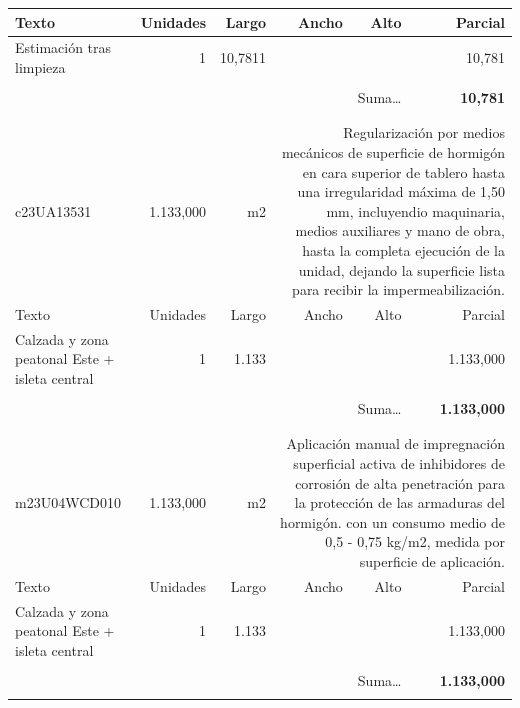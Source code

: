 \documentclass{book}%
\begin{document}
\begin{longtable}{lrrrrr}
Texto&Unidades&Largo&Ancho&Alto&Parcial\\%
\hline%
\multicolumn{1}{p{3.5cm}}{Estimación tras limpieza}&1&10,7811&&&    10,781\\%
&&&&&\\%
\multicolumn{5}{r}{Suma\ldots}&\textbf{    10,781}\\%
\hline%
&&&&&\\%
&&&&&\\%
c23UA13531& 1.133,000& m2&\multicolumn{3}{p{6cm}}{\scriptsize Regularización por medios mecánicos de superficie de hormigón en cara superior de tablero hasta una irregularidad máxima de 1,50 mm, incluyendio maquinaria, medios auxiliares y mano de obra, hasta la completa ejecución de la unidad, dejando la superficie lista para recibir la impermeabilización.\normalsize}\\%
Texto&Unidades&Largo&Ancho&Alto&Parcial\\%
\hline%
\multicolumn{1}{p{3.5cm}}{Calzada y zona peatonal Este + isleta central}&1&1.133&&& 1.133,000\\%
&&&&&\\%
\multicolumn{5}{r}{Suma\ldots}&\textbf{ 1.133,000}\\%
\hline%
&&&&&\\%
&&&&&\\%
m23U04WCD010& 1.133,000& m2&\multicolumn{3}{p{6cm}}{\scriptsize Aplicación manual de impregnación superficial activa de inhibidores de corrosión de alta penetración para la protección de las armaduras del hormigón. con un consumo medio de 0,5 - 0,75 kg/m2, medida por superficie de aplicación.\normalsize}\\%
Texto&Unidades&Largo&Ancho&Alto&Parcial\\%
\hline%
\multicolumn{1}{p{3.5cm}}{Calzada y zona peatonal Este + isleta central}&1&1.133&&& 1.133,000\\%
&&&&&\\%
\multicolumn{5}{r}{Suma\ldots}&\textbf{ 1.133,000}\\%
\hline%
&&&&&\\%
\end{longtable}%
\newpage

%
\end{document}
